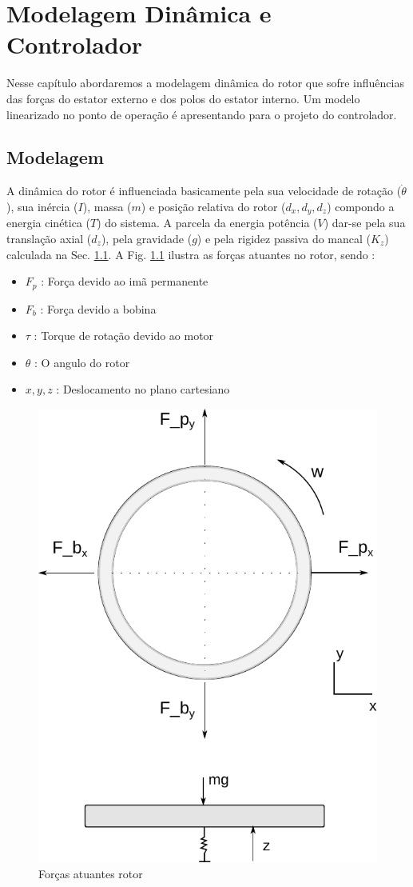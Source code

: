 \pagestyle{empty}
\cleardoublepage
\pagestyle{fancy}

\chapter{Modelagem Dinâmica e Controlador} \label{Cap:Modelagem:Dinamica}

 Nesse capítulo abordaremos a modelagem dinâmica do rotor que sofre influências das forças do estator externo e dos polos do estator interno. Um modelo linearizado no ponto de operação é apresentando para o projeto do controlador.
 
\section{Modelagem}

A dinâmica do rotor é influenciada basicamente pela sua velocidade de rotação ($\dot{\theta}$), sua inércia ($I$), massa ($m$) e posição relativa do rotor ($d_x,d_y,d_z$) compondo a energia cinética ($T$) do sistema. A parcela da energia potência ($V$) dar-se pela  sua translação axial ($d_z$), pela gravidade ($g$) e pela rigidez passiva do mancal ($K_z$) calculada na Sec. \ref{}. A Fig. \ref{fig:modelo:forcas} ilustra as forças atuantes no rotor, sendo :

 \begin{itemize}
 	\item $F_p$ : Força devido ao imã permanente
 	\item $F_b$ : Força devido a bobina
 	\item $\tau$ : Torque de rotação devido ao motor
 	\item $\theta$ : O angulo do rotor
 	\item $x,y,z$ : Deslocamento no plano cartesiano 
 \end{itemize}

 \begin{figure}[th]
 	\centering
 	\includegraphics[width=0.7\linewidth]{../Figs/Modelagem/forcas}
 	\caption{Forças atuantes rotor}
 	\label{fig:modelo:forcas}
 \end{figure}
 
